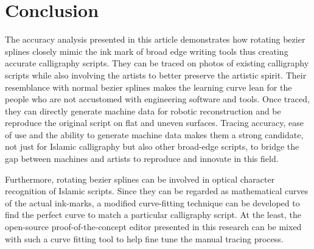 \section{Conclusion}
\label{Chapter:Conclusion}
{
    The accuracy analysis presented in this article demonstrates how rotating bezier splines closely mimic the ink mark of broad edge writing tools thus creating accurate calligraphy scripts. They can be traced on photos of existing calligraphy scripts while also involving the artists to better preserve the artistic spirit. Their resemblance with normal bezier splines makes the learning curve lean for the people who are not accustomed with engineering software and tools. Once traced, they can directly generate machine data for robotic reconstruction and be reproduce the original script on flat and uneven surfaces. Tracing accuracy, ease of use and the ability to generate machine data makes them a strong candidate, not just for Islamic calligraphy but also other broad-edge scripts, to bridge the gap between machines and artists to reproduce and innovate in this field.

    Furthermore, rotating bezier splines can be involved in optical character recognition of Islamic scripts. Since they can be regarded as mathematical curves of the actual ink-marks, a modified curve-fitting technique can be developed to find the perfect curve to match a particular calligraphy script. At the least, the open-source proof-of-the-concept editor presented in this research can be mixed with such a curve fitting tool to help fine tune the manual tracing process.
} 